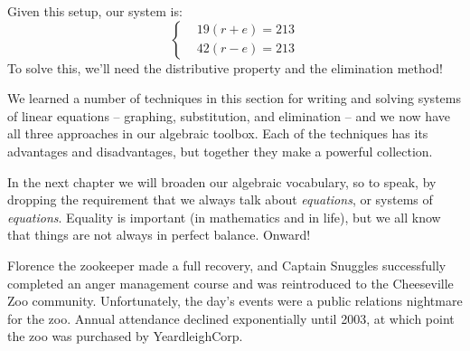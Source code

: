 %
%
%
Given this setup, our system is:
\[
\left\{%
\begin{aligned}
&19(r+e) = 213\\
&42(r-e) = 213
\end{aligned}
\right.
\]
To solve this, we'll need the distributive property and the elimination method!


\chaptersummary

We learned a number of techniques in this section for writing and solving systems of linear equations -- graphing, substitution, and elimination -- and we now have all three approaches in our algebraic toolbox. Each of the techniques has its advantages and disadvantages, but together they make a powerful collection.

In the next chapter we will broaden our algebraic vocabulary, so to speak, by dropping the requirement that we always talk about \textit{equations}, or systems of \textit{equations}. Equality is important (in mathematics and in life), but we all know that things are not always in perfect balance. Onward!

\bigskip
\begin{boxcheese}
Florence the zookeeper made a full recovery, and Captain Snuggles successfully completed an anger management course and was reintroduced to the Cheeseville Zoo community. Unfortunately, the day's events were a public relations nightmare for the zoo. Annual attendance declined exponentially until 2003, at which point the zoo was purchased by YeardleighCorp.
\end{boxcheese}
